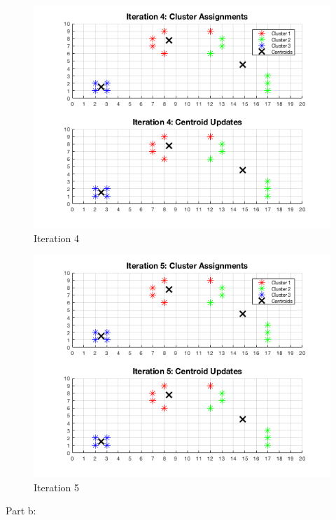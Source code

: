 \documentclass[english]{article}
\begin{document}
\begin{enumerate}
    \begin{figure}[H]
    \centering
    \includegraphics[scale = 0.85]{iter4_a}
    \caption{Iteration 4}
    \end{figure}
    
    \begin{figure}[H]
    \centering
    \includegraphics[scale = 0.85]{iter5_a}
    \caption{Iteration 5}
    \end{figure}
    
    \newpage
    Part b:
    

\end{enumerate}
\end{document}
